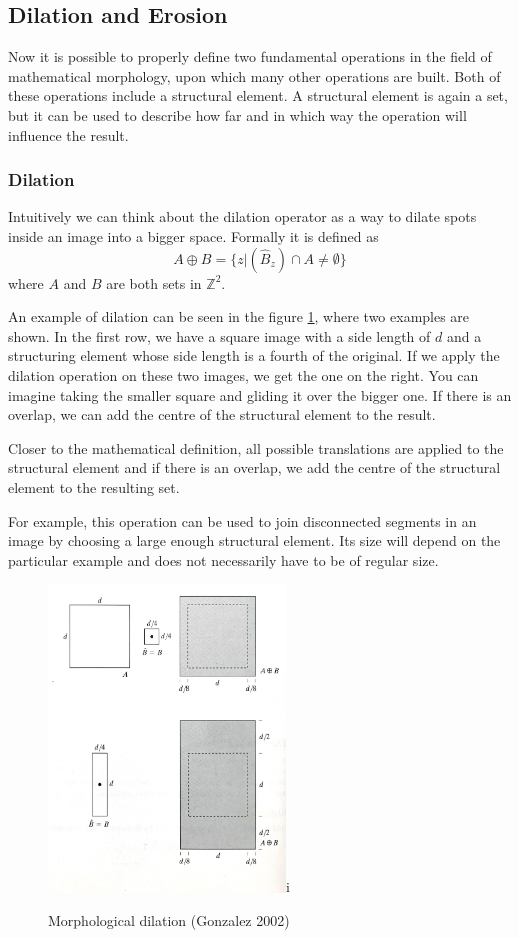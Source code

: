 \documentclass[
  digital,     %
  oneside,     %
  nosansbold,  %
  nocolorbold, %
  lof,         %
  lot,         %
]{fithesis4}
\newcommand*{\Z}{\ensuremath{\mathbb{Z}}}
\begin{document}
\subsection{Dilation and Erosion}
Now it is possible to properly define two fundamental operations in the field of
mathematical morphology, upon which many other operations are built. Both of
these operations include a structural element. A structural element is again a
set, but it can be used to describe how far and in which way the operation will
influence the result.


\subsubsection{Dilation}
Intuitively we can think about the dilation operator as a way to dilate spots
inside an image into a bigger space. Formally it is defined as
\parencite{gonzalez2002}
$$A \oplus B = \{z | (\hat{B}_z) \cap A \neq \emptyset\}$$
where $A$ and $B$ are both sets in $\Z^2$.

An example of dilation can be seen in the figure \ref{fig:morph_dilation}, where
two examples are shown. In the first row, we have a square image with a side
length of $d$ and a structuring element whose side length is a fourth of the
original. If we apply the dilation operation on these two images, we get the one
on the right. You can imagine taking the smaller square and gliding it over the
bigger one. If there is an overlap, we can add the centre of the structural
element to the result.

Closer to the mathematical definition, all possible translations are applied to
the structural element and if there is an overlap, we add the centre of the
structural element to the resulting set.

For example, this operation can be used to join disconnected segments in an
image by choosing a large enough structural element. Its size will depend on the
particular example and does not necessarily have to be of regular size.

\begin{figure}
    \begin{center}
        \includegraphics[width=6.3cm]{resources/morph_dilation.jpg}i
    \end{center}
    \caption{Morphological dilation (Gonzalez 2002)} %
    \label{fig:morph_dilation}
\end{figure}
\end{document}
